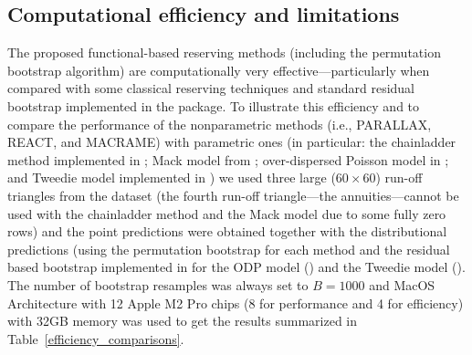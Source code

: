 \subsection{Computational efficiency and limitations}
\label{efficiency}
The proposed functional-based reserving methods (including the permutation bootstrap algorithm) 
are computationally very effective---particularly when compared with some classical reserving techniques 
and standard residual bootstrap implemented in the  package. To illustrate this efficiency and to compare the performance of the nonparametric methods (i.e., PARALLAX, REACT, and MACRAME) with parametric ones (in particular: the chainladder method implemented in ; Mack model from ; over-dispersed Poisson model in ; and Tweedie model implemented in ) we used three large ($60 \times 60$) run-off triangles from the  dataset (the fourth run-off triangle---the annuities---cannot be used with the chainladder method and the Mack model due to some fully zero rows) and the point predictions were obtained together with the distributional predictions (using the permutation bootstrap for each method and the residual based bootstrap implemented in  
for the ODP model ()
and the Tweedie model (). The number of bootstrap resamples was always set 
to $B = 1000$ and MacOS Architecture with 12 Apple M2 Pro chips (8 for performance and 4 for efficiency) with 32GB memory was used to get the results summarized in Table~\ref{efficiency_comparisons}.

